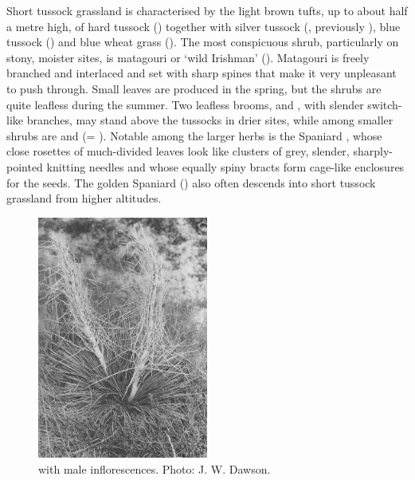Short tussock grassland is characterised by the light brown tufts, up to about half a metre high, of hard tussock () together with silver tussock (, previously ), blue tussock () and blue wheat grass ().
The most conspicuous shrub, particularly on stony, moister sites, is matagouri or `wild Irishman' ().
Matagouri is freely branched and interlaced and set with sharp spines that make it very unpleasant to push through.
Small leaves are produced in the spring, but the shrubs are quite leafless during the summer.
Two leafless brooms,  and , with slender switch-like branches, may stand above the tussocks in drier sites, while among smaller shrubs are  and  (= ).
Notable among the larger herbs is the Spaniard , whose close rosettes of much-divided leaves look like clusters of grey, slender, sharply-pointed knitting needles and whose equally spiny bracts form cage-like enclosures for the seeds.
The golden Spaniard () also often descends into short tussock grassland from higher altitudes.

\begin{figure}
	\includegraphics[width=0.5\textwidth]{graphics/figure84aciphylla.jpg}
	\centering
	\caption[Aciphylla subflabellata with male inflorescencs]{ with male inflorescences.
    Photo:  J. W. Dawson.}
	\label{fig:84aciphylla}
\end{figure}

